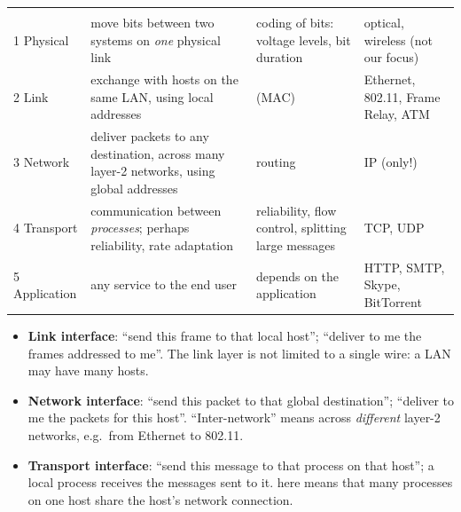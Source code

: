 \begin{center}
\renewcommand{\arraystretch}{1.3}
\small
\begin{tabular}{>{}l L{3.6cm} L{3.4cm} L{3.4cm}}
 &  &  & \\
 \color{surface}1 Physical & move bits between two systems on \emph{one} physical link & coding of bits: voltage levels, bit duration & optical, wireless (not our focus)\\
 \color{surface}2 Link & exchange  with hosts on the same LAN, using local addresses &  (MAC) & Ethernet, 802.11, Frame Relay, ATM\\
 \color{surface}3 Network & deliver packets to any destination, across many layer-2 networks, using global addresses & routing & IP (only!)\\
 \color{surface}4 Transport & communication between \emph{processes}; perhaps reliability, rate adaptation & reliability, flow control, splitting large messages & TCP, UDP\\
 \color{surface}5 Application & any service to the end user & depends on the application & HTTP, SMTP, Skype, BitTorrent\\
\end{tabular}
\end{center}

\begin{itemize}
  \item \textbf{Link interface}: ``send this frame to that local host''; ``deliver to me the frames addressed to me''. The link layer is not limited to a single wire: a LAN may have many hosts.
  \item \textbf{Network interface}: ``send this packet to that global destination''; ``deliver to me the packets for this host''. ``Inter-network'' means across \emph{different} layer-2 networks, e.g.\ from Ethernet to 802.11.
  \item \textbf{Transport interface}: ``send this message to that process on that host''; a local process receives the messages sent to it.
         here means that many processes on one host share the host's network connection.
\end{itemize}

